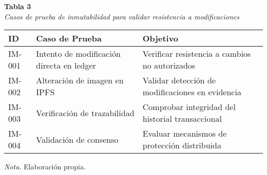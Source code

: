 \begin{table}[htbp]
    \begin{flushleft}
        \textbf{Tabla 3}\\[2em]
        \textit{Casos de prueba de inmutabilidad para validar resistencia a modificaciones}
    \end{flushleft}
    \vspace{1em}
    \centering
    \begin{tabular}{p{2cm} p{6cm} p{4cm}}
        \toprule
        \textbf{ID} & \textbf{Caso de Prueba} & \textbf{Objetivo} \\
        \midrule
        IM-001 & Intento de modificación directa en ledger & Verificar resistencia a cambios no autorizados \\
        IM-002 & Alteración de imagen en IPFS & Validar detección de modificaciones en evidencia \\
        IM-003 & Verificación de trazabilidad & Comprobar integridad del historial transaccional \\
        IM-004 & Validación de consenso & Evaluar mecanismos de protección distribuida \\
        \bottomrule
    \end{tabular}
    \vspace{2em}
    \begin{flushleft}
        \textit{Nota.} Elaboración propia.
    \end{flushleft}
    \label{tab:casos_prueba_inmutabilidad}
\end{table}


